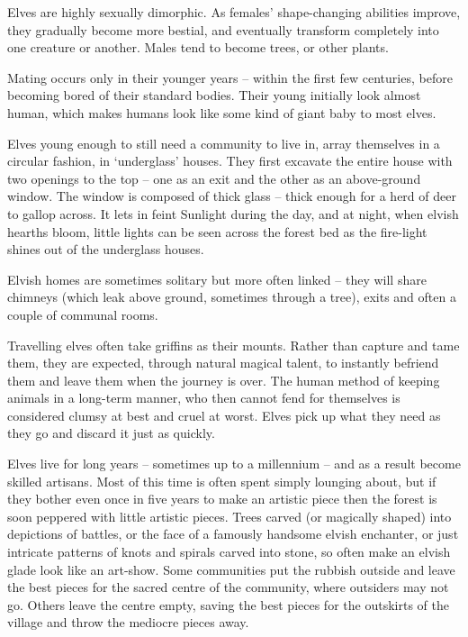 \begin{multicols}{2}
\renewcommand\npcsymbol{\El}

\noindent
Elves are highly sexually dimorphic.
As females' shape-changing abilities improve, they gradually become more bestial, and eventually transform completely into one creature or another.
Males tend to become trees, or other plants.

Mating occurs only in their younger years -- within the first few centuries, before becoming bored of their standard bodies.
Their young initially look almost human, which makes humans look like some kind of giant baby to most elves.

Elves young enough to still need a community to live in, array themselves in a circular fashion, in `underglass' houses.
They first excavate the entire house with two openings to the top -- one as an exit and the other as an above-ground window.
The window is composed of thick glass -- thick enough for a herd of deer to gallop across.
It lets in feint Sunlight during the day, and at night, when elvish hearths bloom, little lights can be seen across the forest bed as the fire-light shines out of the underglass houses.

Elvish homes are sometimes solitary but more often linked -- they will share chimneys (which leak above ground, sometimes through a tree), exits and often a couple of communal rooms.

Travelling elves often take griffins as their mounts. Rather than capture and tame them, they are expected, through natural magical talent, to instantly befriend them and leave them when the journey is over. The human method of keeping animals in a long-term manner, who then cannot fend for themselves is considered clumsy at best and cruel at worst. Elves pick up what they need as they go and discard it just as quickly.

Elves live for long years -- sometimes up to a millennium -- and as a result become skilled artisans.
Most of this time is often spent simply lounging about, but if they bother even once in five years to make an artistic piece then the forest is soon peppered with little artistic pieces.
Trees carved (or magically shaped) into depictions of battles, or the face of a famously handsome elvish enchanter, or just intricate patterns of knots and spirals carved into stone, so often make an elvish glade look like an art-show.
Some communities put the rubbish outside and leave the best pieces for the sacred centre of the community, where outsiders may not go.
Others leave the centre empty, saving the best pieces for the outskirts of the village and throw the mediocre pieces away.


\end{multicols}
